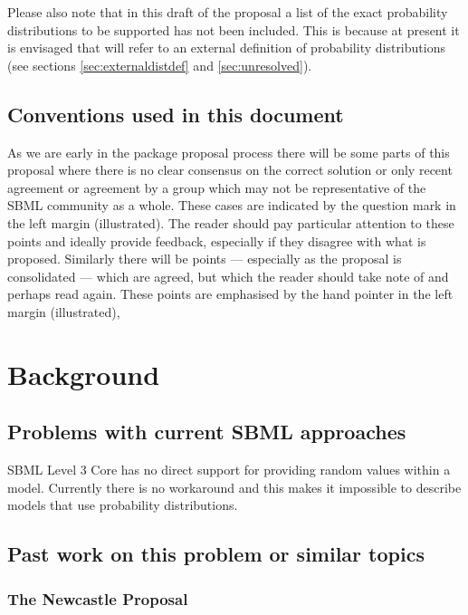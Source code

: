 \documentclass[draftspec]{sbmlpkgspec}
\begin{document}
Please also note that in this draft of the proposal a list of the
exact probability distributions to be supported has not been
included. This is because at present it is envisaged that
\distribshort will refer to an external definition of probability
distributions (see sections \ref{sec:externaldistdef} and
\ref{sec:unresolved}).

\subsection{Conventions used in this document}

As we are early in the package proposal process there will be some
parts of this proposal where there is no clear consensus on the
correct solution or only recent agreement or agreement by a group
which may not be representative of the SBML community as a
whole. These cases are indicated by the \contraversial question mark
in the left margin (illustrated). The reader should pay particular
attention to these points and ideally provide feedback, especially if
they disagree with what is proposed. Similarly there will be points
--- especially as the proposal is consolidated --- which are agreed,
but which the reader should take note of and perhaps read again. These
points \watchout are emphasised by the hand pointer in the left margin
(illustrated),

\section{Background}

\subsection{Problems with current SBML approaches}

SBML Level 3 Core has no direct support for providing random values
within a model. Currently there is no workaround and this makes it
impossible to describe models that use probability distributions.

\subsection{Past work on this problem or similar topics}

\subsubsection{The Newcastle Proposal}
\label{sec:newcastle proposal}
\end{document}
